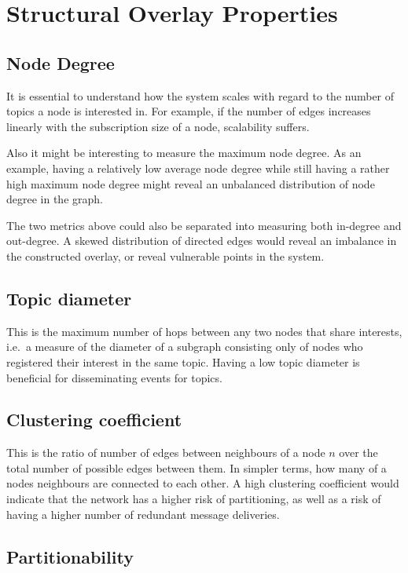 
\section{Structural Overlay Properties}

\subsection{Node Degree}

It is essential to understand how the system scales with regard
to the number of topics a node is interested in. For example, if the number of
edges increases linearly with the subscription size of a node,
scalability suffers.

Also it might be interesting to measure the maximum node degree. As an
example, having a relatively low average node degree while still having
a rather high maximum node degree might reveal an unbalanced
distribution of node degree in the graph.

The two metrics above could also be separated into measuring both
in-degree and out-degree. A skewed distribution of directed edges
would reveal an imbalance in the constructed overlay, or reveal
vulnerable points in the system.

\subsection{Topic diameter}

This is the maximum number of hops between any two nodes that
share interests, i.e.\ a measure of the diameter of a subgraph
consisting only of nodes who registered their interest in the
same topic. Having a low topic diameter is beneficial for
disseminating events for topics.

\subsection{Clustering coefficient}

This is the ratio of number of edges between neighbours of a node $n$ over
the total number of possible edges between them. In simpler
terms, how
many of a nodes neighbours are connected to each other. A high
clustering coefficient would indicate that the network has a
higher risk of partitioning, as well as a risk of having a
higher number of redundant message deliveries.

\subsection{Partitionability}

